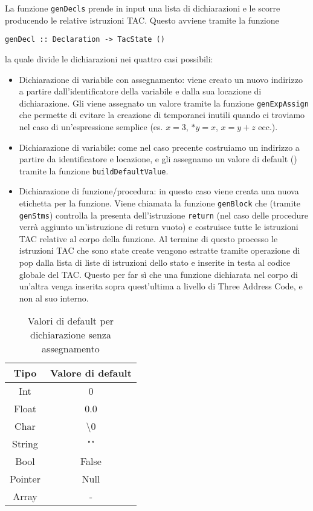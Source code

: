 La funzione {\tt genDecls} prende in input una lista di dichiarazioni e le scorre producendo le relative istruzioni TAC. Questo avviene tramite la funzione 
\begin{center}
    {\tt genDecl :: Declaration -> TacState ()}
\end{center}
la quale divide le dichiarazioni nei quattro casi possibili:
\begin{itemize}
    \item Dichiarazione di variabile con assegnamento: viene creato un nuovo indirizzo a partire dall'identificatore della variabile e dalla sua locazione di dichiarazione. Gli viene assegnato un valore tramite la funzione {\tt genExpAssign} che permette di evitare la creazione di temporanei inutili quando ci troviamo nel caso di un'espressione semplice (es. $x = 3$, $*y= x$, $x = y + z$ ecc.).
    \item Dichiarazione di variabile: come nel caso precente costruiamo un indirizzo a partire da identificatore e locazione, e gli assegnamo un valore di default (\label{table:valori_default}) tramite la funzione {\tt buildDefaultValue}.
    \item Dichiarazione di funzione/procedura: in questo caso viene creata una nuova etichetta per la funzione. Viene chiamata la funzione {\tt genBlock} che (tramite {\tt genStms}) controlla la presenta dell'istruzione {\tt return} (nel caso delle procedure verrà aggiunto un'istruzione di return vuoto) e costruisce tutte le istruzioni TAC relative al corpo della funzione. Al termine di questo processo le istruzioni TAC che sono state create vengono estratte tramite operazione di pop dalla lista di liste di istruzioni dello stato e inserite in testa al codice globale del TAC. Questo per far sì che una funzione dichiarata nel corpo di un'altra venga inserita sopra quest'ultima a livello di Three Address Code, e non al suo interno.
\end{itemize}

\begin{table}
\centering
    \begin{tabular}{|c c|} 
        \hline
        Tipo & Valore di default \\ [0.5ex] 
        \hline\hline
        Int & 0 \\ 
        Float & 0.0  \\
        Char & \textbackslash0 \\
        String &  "" \\
        Bool & False \\ 
        Pointer & Null\\
        Array & - \\[1ex] 
        \hline
    \end{tabular}
    \caption{Valori di default per dichiarazione senza assegnamento}
    \label{table:valori_default}
\end{table}


